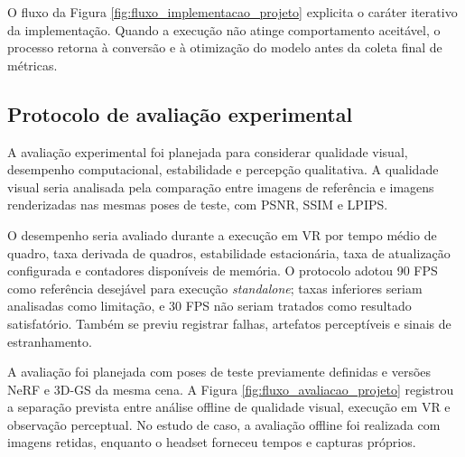 O fluxo da Figura \ref{fig:fluxo_implementacao_projeto} explicita o caráter iterativo da implementação. Quando a execução não atinge comportamento aceitável, o processo retorna à conversão e à otimização do modelo antes da coleta final de métricas.

\subsection{Protocolo de avaliação experimental}

A avaliação experimental foi planejada para considerar qualidade visual, desempenho computacional, estabilidade e percepção qualitativa. A qualidade visual seria analisada pela comparação entre imagens de referência e imagens renderizadas nas mesmas poses de teste, com PSNR, SSIM e LPIPS.

O desempenho seria avaliado durante a execução em VR por tempo médio de quadro, taxa derivada de quadros, estabilidade estacionária, taxa de atualização configurada e contadores disponíveis de memória. O protocolo adotou 90 FPS como referência desejável para execução \textit{standalone}; taxas inferiores seriam analisadas como limitação, e 30 FPS não seriam tratados como resultado satisfatório. Também se previu registrar falhas, artefatos perceptíveis e sinais de estranhamento.

A avaliação foi planejada com poses de teste previamente definidas e versões NeRF e 3D-GS da mesma cena. A Figura \ref{fig:fluxo_avaliacao_projeto} registrou a separação prevista entre análise offline de qualidade visual, execução em VR e observação perceptual. No estudo de caso, a avaliação offline foi realizada com imagens retidas, enquanto o headset forneceu tempos e capturas próprios.

